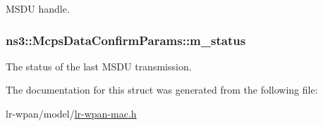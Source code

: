 M\+S\+DU handle. 

\subsubsection[{\texorpdfstring{m\+\_\+status}{m_status}}]{ ns3\+::\+Mcps\+Data\+Confirm\+Params\+::m\+\_\+status}\hypertarget{structns3_1_1McpsDataConfirmParams_a8f62949258fb8ca94621ce33361a3953}{}\label{structns3_1_1McpsDataConfirmParams_a8f62949258fb8ca94621ce33361a3953}


The status of the last M\+S\+DU transmission. 



The documentation for this struct was generated from the following file\+:\begin{DoxyCompactItemize}
\item 
lr-\/wpan/model/\hyperlink{lr-wpan-mac_8h}{lr-\/wpan-\/mac.\+h}\end{DoxyCompactItemize}
